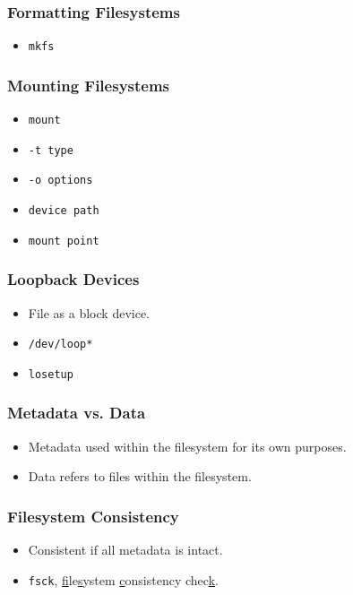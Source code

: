 \documentclass[xcolor={dvipsnames,svgnames},hyperref=dvips]{beamer}
\begin{document}
	\begin{frame}
		\frametitle{Formatting Filesystems}
		\begin{itemize}
		\item \texttt{mkfs}
		\end{itemize}
	\end{frame}

	\begin{frame}
		\frametitle{Mounting Filesystems}
		\begin{itemize}
		\item \texttt{mount}
		\item \texttt{-t type}
		\item \texttt{-o options}
		\item \texttt{device path}
		\item \texttt{mount point}
		\end{itemize}
	\end{frame}

	\begin{frame}
		\frametitle{Loopback Devices}
		\begin{itemize}
		\item File as a block device.
		\item \texttt{/dev/loop*}
		\item \texttt{losetup}
		\end{itemize}
	\end{frame}

	\begin{frame}
		\frametitle{Metadata vs. Data}
		\begin{itemize}
		\item Metadata used within the filesystem for its own purposes.
		\item Data refers to files within the filesystem.
		\end{itemize}
	\end{frame}

	\begin{frame}
		\frametitle{Filesystem Consistency}
		\begin{itemize}
		\item Consistent if all metadata is intact.
		\item \texttt{fsck}, \underline{f}ile\underline{s}ystem \underline{c}onsistency chec\underline{k}.
		\end{itemize}
	\end{frame}
\end{document}
